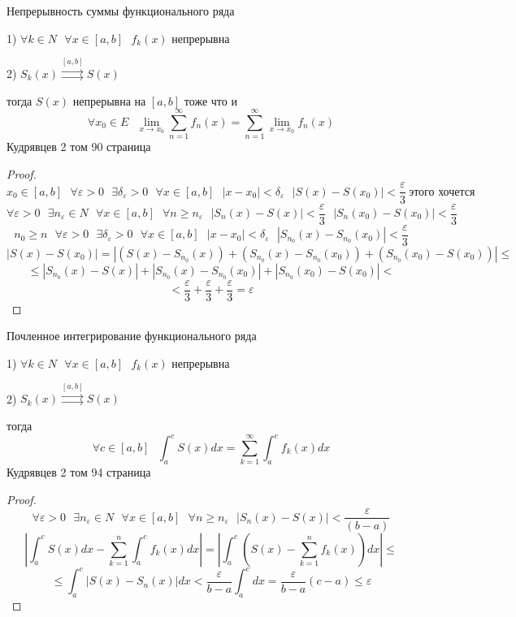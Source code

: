 \begin{title}[\Large]
  Непрерывность суммы функционального ряда
\end{title}

\begin{theorem}
  1) $\forall k \in N ~~~ \forall x \in [a,b] ~~~ f_k(x)$ непрерывна

  2) $S_k (x) \stackrel{[a,b]}{\rightrightarrows} S(x)$

  тогда $S(x)$ непрерывна на $[a,b]$ тоже что и
  $$
  \forall x_0 \in E ~~~
  \lim_{x \to x_0} \sum_{n=1}^{\infty} f_n (x) = \sum_{n=1}^{\infty}
  \lim_{x \to x_0} f_n(x)
  $$
  Кудрявцев 2 том 90 страница
\end{theorem}

\begin{proof}
  $$
  x_0 \in [a,b] ~~~ \forall \varepsilon > 0 ~~~ \exists \delta_{\varepsilon} > 0
   ~~~ \forall x \in [a,b] ~~~ |x - x_0| < \delta_{\varepsilon} ~~~
  |S(x) - S(x_0)| < \frac{\varepsilon}{3} ~ \text{этого хочется}
  $$
  $$
  \forall \varepsilon > 0 ~~~ \exists n_{\varepsilon} \in N ~~~
  \forall x \in [a,b] ~~~ \forall n \ge n_{\varepsilon} ~~~ |S_n(x) - S(x)| <
  \frac{\varepsilon}{3} ~~~ |S_n(x_0) - S(x_0)| < \frac{\varepsilon}{3}
  $$
  $$
  n_0 \ge n ~~~ \forall \varepsilon > 0
  ~~~ \exists \delta_{\varepsilon} > 0 ~~~ \forall x \in [a,b] ~~~ |x - x_0| <
  \delta_{\varepsilon} ~~~ |S_{n_0}(x) - S_{n_0}(x_0)| < \frac{\varepsilon}{3}
  $$
  $$
  |S(x) - S(x_0)| =  |(S(x) - S_{n_0}(x)) + (S_{n_0}(x) - S_{n_0}(x_0))
  + (S_{n_0}(x_0) - S(x_0))| \le
  $$
  $$
   \le |S_{n_0}(x) - S(x)| +
  |S_{n_0}(x) - S_{n_0}(x_0)| + |S_{n_0}(x_0) - S(x_0)| <
  $$
  $$
  < \frac{\varepsilon}{3} +
  \frac{\varepsilon}{3} + \frac{\varepsilon}{3} = \varepsilon
  $$
\end{proof}

\begin{title}[\Large]
  Почленное интегрирование функционального ряда
\end{title}

\begin{theorem}
  1) $\forall k \in N ~~~ \forall x \in [a,b] ~~~ f_k(x)$ непрерывна

  2) $S_k(x) \stackrel{[a,b]}{\rightrightarrows} S(x)$

  тогда
  $$
  \forall c \in [a,b] ~~~ \int_a^c S(x)dx =
  \sum_{k=1}^{\infty} \int_a^c f_k(x)dx
  $$
  Кудрявцев 2 том 94 страница
\end{theorem}

\begin{proof}
  $$
  \forall \varepsilon  > 0 ~~~ \exists n_{\varepsilon} \in N ~~~
  \forall x \in[a,b] ~~~ \forall n \ge n_{\varepsilon} ~~~
  |S_n(x) - S(x)| < \frac{\varepsilon}{(b-a)}
  $$
  $$
  \left| \int_a^c S(x)dx - \sum_{k=1}^n \int_a^c f_k(x)dx \right| =
  \left| \int_a^c \left( S(x) - \sum_{k=1}^n f_k(x) \right)dx \right| \le
  $$
  $$
  \le \int_a^c |S(x) - S_n(x)|dx < \frac{\varepsilon}{b-a} \int_a^c dx =
  \frac{\varepsilon}{b-a}(c-a) \le \varepsilon
  $$
\end{proof}

